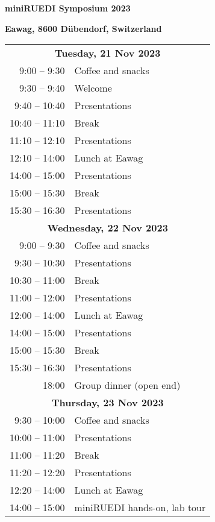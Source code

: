 \documentclass[12pt]{extbook}
\begin{document}
\thispagestyle{empty}
\begin{center}

{\LARGE \bf miniRUEDI Symposium 2023}

\bigskip
\bigskip
\bigskip

{\large \bf Eawag, 8600 Dübendorf, Switzerland}

\bigskip
\bigskip
\bigskip
\bigskip
\bigskip
\bigskip



\begin{tabular}{r@{\hskip 0.5in}l}

\multicolumn{2}{c}{\bf Tuesday, 21 Nov 2023}\\[2ex]
9:00  -- 9:30	  &	Coffee and snacks\\
9:30  -- 9:40	  &	Welcome\\
9:40  -- 10:40	&	Presentations\\   %
10:40 -- 11:10	&	Break\\
11:10 -- 12:10	& Presentations\\   %
12:10 -- 14:00	&	Lunch at Eawag\\
14:00 -- 15:00	&	Presentations\\   %
15:00 -- 15:30	&	Break\\
15:30 -- 16:30	&	Presentations\\[8ex]   %

\multicolumn{2}{c}{\bf Wednesday, 22 Nov 2023}\\[2ex]
9:00  -- 9:30	  &	Coffee and snacks\\
9:30  -- 10:30	&	Presentations\\   %
10:30 -- 11:00	&	Break\\
11:00 -- 12:00	& Presentations\\   %
12:00 -- 14:00	&	Lunch at Eawag\\
14:00 -- 15:00	&	Presentations\\   %
15:00 -- 15:30	&	Break\\
15:30 -- 16:30	&	Presentations\\   %
18:00 \phantom{-- 00:00}	&	Group dinner (open end)\\[8ex]

\multicolumn{2}{c}{\bf Thursday, 23 Nov 2023}\\[2ex]
9:30  -- 10:00	&	Coffee and snacks\\   %
10:00 -- 11:00	&	Presentations\\
11:00 -- 11:20	&	Break\\
11:20 -- 12:20	& Presentations\\       %
12:20 -- 14:00	&	Lunch at Eawag\\
14:00 -- 15:00	&	miniRUEDI hands-on, lab tour\\[1.5ex]


\end{tabular}
\end{center}
\end{document}
